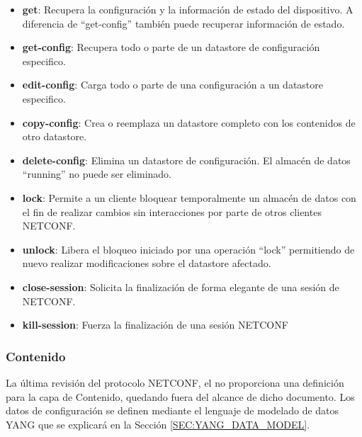 \begin{itemize}
    \item \textbf{get}: Recupera la configuración y la información de estado del dispositivo. A diferencia de ``get-config'' también puede recuperar información de estado.
    \item \textbf{get-config}: Recupera todo o parte de un datastore de configuración especifico. 
    \item \textbf{edit-config}: Carga todo o parte de una configuración a un datastore especifico.
    \item \textbf{copy-config}: Crea o reemplaza un datastore completo con los contenidos de otro datastore.
    \item \textbf{delete-config}: Elimina un datastore de configuración. El almacén de datos ``running'' no puede ser eliminado.
    \item \textbf{lock}: Permite a un cliente bloquear temporalmente un almacén de datos con el fin de realizar cambios sin interacciones por parte de otros clientes \ac{NETCONF}.
    \item \textbf{unlock}: Libera el bloqueo iniciado por una operación ``lock'' permitiendo de nuevo realizar modificaciones sobre el datastore afectado.
    \item \textbf{close-session}: Solicita la finalización de forma elegante de una sesión de \ac{NETCONF}.
    \item \textbf{kill-session}: Fuerza la finalización de una sesión \ac{NETCONF}
\end{itemize}

\subsubsection{Contenido}

La última revisión del protocolo \ac{NETCONF}, el \cite{RFC6241} no proporciona una definición para la capa de Contenido, quedando fuera del alcance de dicho documento. Los datos de configuración se definen mediante el lenguaje de modelado de datos YANG que se explicará en la Sección \ref{SEC:YANG_DATA_MODEL}.




